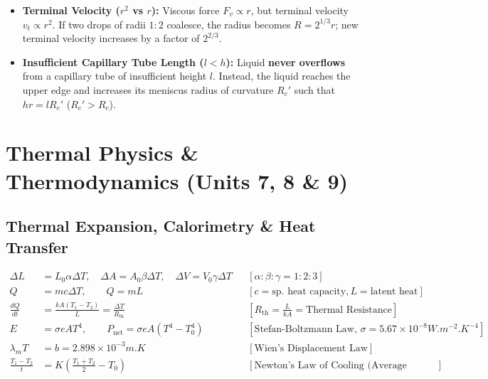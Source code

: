 \documentclass[11pt,a4paper]{article}
\begin{document}
\begin{trapbox}
\begin{itemize}
  \item \textbf{Terminal Velocity ($r^2$ vs $r$):} Viscous force $F_v \propto r$, but terminal velocity $v_t \propto r^2$. If two drops of radii $1:2$ coalesce, the radius becomes $R = 2^{1/3}r$; new terminal velocity increases by a factor of $2^{2/3}$.
  \item \textbf{Insufficient Capillary Tube Length ($l < h$):} Liquid \textbf{never overflows} from a capillary tube of insufficient height $l$. Instead, the liquid reaches the upper edge and increases its meniscus radius of curvature $R_c'$ such that $h r = l R_c'$ ($R_c' > R_c$).
\end{itemize}
\end{trapbox}

\newpage

\section{Thermal Physics \& Thermodynamics (Units 7, 8 \& 9)}

\subsection{Thermal Expansion, Calorimetry \& Heat Transfer}

\begin{formulabox}
\begin{align}
  \Delta L &= L_0 \alpha \Delta T, \quad \Delta A = A_0 \beta \Delta T, \quad \Delta V = V_0 \gamma \Delta T && [\alpha : \beta : \gamma = 1 : 2 : 3] \\
  Q &= m c \Delta T, \qquad Q = m L && [c = \text{sp. heat capacity}, L = \text{latent heat}] \\
  \frac{dQ}{dt} &= \frac{kA(T_1 - T_2)}{L} = \frac{\Delta T}{R_{\text{th}}} && [R_{\text{th}} = \frac{L}{kA} = \text{Thermal Resistance}] \\
  E &= \sigma e A T^4, \qquad P_{\text{net}} = \sigma e A(T^4 - T_0^4) && [\text{Stefan-Boltzmann Law, } \sigma = 5.67\times 10^{-8}\si{W.m^{-2}.K^{-4}}] \\
  \lambda_m T &= b = 2.898\times 10^{-3}\si{m.K} && [\text{Wien's Displacement Law}] \\
  \frac{T_1 - T_2}{t} &= K\left(\frac{T_1 + T_2}{2} - T_0\right) && [\text{Newton's Law of Cooling (Average Form)}]
\end{align}
\end{formulabox}
\end{document}
